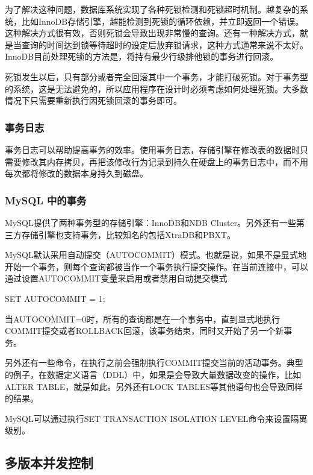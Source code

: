 为了解决这种问题，数据库系统实现了各种死锁检测和死锁超时机制。越复杂的系统，比如InnoDB存储引擎，越能检测到死锁的循环依赖，并立即返回一个错误。这种解决方式很有效，否则死锁会导致出现非常慢的查询。还有一种解决方式，就是当查询的时间达到锁等待超时的设定后放弃锁请求，这种方式通常来说不太好。InnoDB目前处理死锁的方法是，将持有最少行级排他锁的事务进行回滚。

死锁发生以后，只有部分或者完全回滚其中一个事务，才能打破死锁。对于事务型的系统，这是无法避免的，所以应用程序在设计时必须考虑如何处理死锁。大多数情况下只需要重新执行因死锁回滚的事务即可。

\subsubsection*{事务日志}

事务日志可以帮助提高事务的效率。使用事务日志，存储引擎在修改表的数据时只需要修改其内存拷贝，再把该修改行为记录到持久在硬盘上的事务日志中，而不用每次都将修改的数据本身持久到磁盘。

\subsubsection*{MySQL 中的事务}

MySQL提供了两种事务型的存储引擎：InnoDB和NDB Cluster。另外还有一些第三方存储引擎也支持事务，比较知名的包括XtraDB和PBXT。

MySQL默认采用自动提交（AUTOCOMMIT）模式。也就是说，如果不是显式地开始一个事务，则每个查询都被当作一个事务执行提交操作。在当前连接中，可以通过设置AUTOCOMMIT变量来启用或者禁用自动提交模式

\begin{sql}
SET AUTOCOMMIT = 1;
\end{sql}

当AUTOCOMMIT=0时，所有的查询都是在一个事务中，直到显式地执行COMMIT提交或者ROLLBACK回滚，该事务结束，同时又开始了另一个新事务。

另外还有一些命令，在执行之前会强制执行COMMIT提交当前的活动事务。典型的例子，在数据定义语言（DDL）中，如果是会导致大量数据改变的操作，比如ALTER TABLE，就是如此。另外还有LOCK TABLES等其他语句也会导致同样的结果。

MySQL可以通过执行SET TRANSACTION ISOLATION LEVEL命令来设置隔离级别。

\subsection{多版本并发控制}

